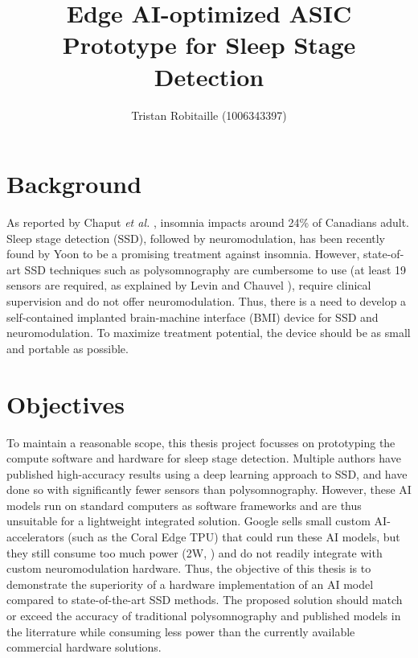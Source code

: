 \documentclass[12pt]{article}
\title{Edge AI-optimized ASIC Prototype for Sleep Stage Detection}
\author{Tristan Robitaille (1006343397)}
\date{}
\begin{document}
\maketitle

\thispagestyle{fancy}

\section{Background}
As reported by Chaput \textit{et al.} \cite{insomnia_prevalence}, insomnia impacts around 24\% of Canadians adult. Sleep stage detection (SSD), followed by neuromodulation, has been recently found by Yoon \cite{yoon2021neuromodulation} to be a promising
treatment against insomnia. However, state-of-art SSD techniques such as polysomnography are cumbersome to use (at least 19 sensors are required, as explained by Levin and Chauvel \cite{RUNDO2019381}), require clinical supervision and do not offer neuromodulation.
Thus, there is a need to develop a self-contained implanted brain-machine interface (BMI) device for SSD and neuromodulation. To maximize treatment potential, the device should be as small and portable as possible.

\section{Objectives}
To maintain a reasonable scope, this thesis project focusses on prototyping the compute software and hardware for sleep stage detection. Multiple authors \cite{dutt2023sleepxai, fu2021deep, eldele2021attention} have published high-accuracy results using a deep learning approach to SSD, and have done so with significantly fewer sensors 
than polysomnography. However, these AI models run on standard computers as software frameworks and are thus unsuitable for a lightweight integrated solution. Google sells small custom AI-accelerators (such as the Coral Edge TPU) that could run these AI models, but they still consume too much power (2W, \cite{coral_datasheet}) and do not readily integrate with
custom neuromodulation hardware.
Thus, the objective of this thesis is to demonstrate the superiority of a hardware implementation of an AI model compared to state-of-the-art SSD methods. The proposed solution should match or exceed the accuracy of traditional polysomnography and published models in the literrature while consuming less power than the currently available commercial hardware solutions.
\end{document}
